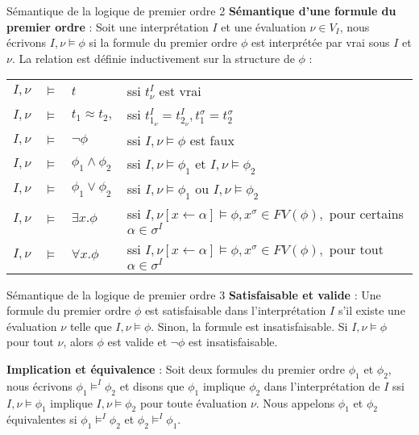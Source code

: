 \documentclass[9pt]{beamer}
\begin{document}
\begin{frame}{S\'emantique de la logique de premier ordre 2}
\textbf{S\'emantique d'une formule du premier ordre} : Soit une interpr\'etation $I$ et une \'evaluation $\nu \in V_{I}$, nous \'ecrivons $I,\nu\models\phi$ si la formule du premier ordre $\phi$ est interpr\'et\'ee par vrai sous $I$ et $\nu$. La relation est d\'efinie inductivement sur la structure de $\phi$ :

\begin{tabular}{rcll}
$I,\nu$ & $\models$ & $t$ & ssi $t^{I}_{\nu}$ est vrai\\
$I,\nu$ & $\models$ & $t_{1}\approx t_{2},$ & ssi $t^{I}_{1_{\nu}}=t^{I}_{2_{\nu}},t^{\sigma}_{1}=t^{\sigma}_{2}$\\
$I,\nu$ & $\models$ & $\neg\phi$ & ssi $I,\nu\models\phi$ est faux\\
$I,\nu$ & $\models$ & $\phi_{1}\land\phi_{2}$ & ssi $I,\nu\models\phi_{1}$ et $I,\nu\models\phi_{2}$\\
$I,\nu$ & $\models$ & $\phi_{1}\lor\phi_{2}$ & ssi $I,\nu\models\phi_{1}$ ou $I,\nu\models\phi_{2}$\\
$I,\nu$ & $\models$ & $\exists x.\phi$ & ssi $I,\nu[x\leftarrow\alpha]\models\phi, x^{\sigma}\in FV(\phi),$ pour certains $\alpha\in\sigma^{I}$\\
$I,\nu$ & $\models$ & $\forall x.\phi$ & ssi $I,\nu[x\leftarrow\alpha]\models\phi, x^{\sigma}\in FV(\phi),$ pour tout $\alpha\in\sigma^{I}$

\end{tabular}
\end{frame}

\begin{frame}{S\'emantique de la logique de premier ordre 3}
\textbf{Satisfaisable et valide} : Une formule du premier ordre $\phi$ est satisfaisable dans l'interpr\'etation $I$ s'il existe une \'evaluation $\nu$ telle que $I,\nu\models\phi$. Sinon, la formule est insatisfaisable. Si $I,\nu\models\phi$ pour tout $\nu$, alors $\phi$ est valide et $\neg\phi$ est insatisfaisable.

\textbf{Implication et \'equivalence} : Soit deux formules du premier ordre $\phi_{1}$ et $\phi_{2}$, nous \'ecrivons $\phi_{1}\models^{I}\phi_{2}$ et disons que $\phi_{1}$ implique $\phi_{2}$ dans l'interpr\'etation de $I$ ssi $I,\nu\models\phi_{1}$ implique $I,\nu\models\phi_{2}$ pour toute \'evaluation $\nu$. Nous appelons $\phi_{1}$  et $\phi_{2}$  \'equivalentes si $\phi_{1}\models^{I}\phi_{2}$ et $\phi_{2}\models^{I}\phi_{1}$.
\end{frame}
\end{document}
